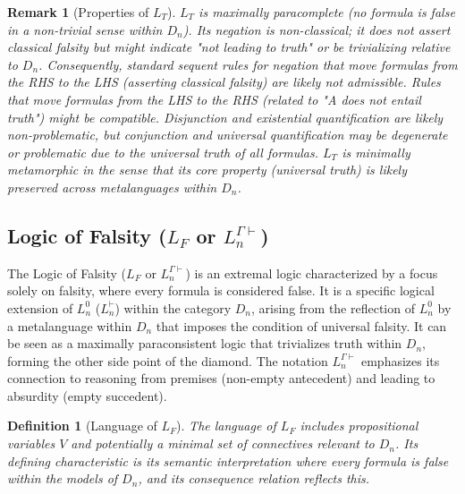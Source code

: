 \documentclass{article}
\newtheorem{definition}{Definition}[section] %
\newtheorem{remark}{Remark}[section] %
\newcommand{\LT}{L_T} %
\newcommand{\LF}{L_F} %
\begin{document}
																																											\begin{remark}[Properties of $\LT$]
																																												$\LT$ is maximally paracomplete (no formula is false in a non-trivial sense within $D_n$). Its negation is non-classical; it does not assert classical falsity but might indicate "not leading to truth" or be trivializing relative to $D_n$. Consequently, standard sequent rules for negation that move formulas from the RHS to the LHS (asserting classical falsity) are likely not admissible. Rules that move formulas from the LHS to the RHS (related to "A does not entail truth") might be compatible. Disjunction and existential quantification are likely non-problematic, but conjunction and universal quantification may be degenerate or problematic due to the universal truth of all formulas. $\LT$ is minimally metamorphic in the sense that its core property (universal truth) is likely preserved across metalanguages within $D_n$.
																																												\end{remark}
																																													
																																													\subsection{Logic of Falsity ($\LF$ or $L^{\Gamma\vdash}_n$)}
																																													
																																													The Logic of Falsity ($\LF$ or $L^{\Gamma\vdash}_n$) is an extremal logic characterized by a focus solely on falsity, where every formula is considered false. It is a specific logical extension of $L^0_n$ ($L^{\vdash}_n$) within the category $D_n$, arising from the reflection of $L^0_n$ by a metalanguage within $D_n$ that imposes the condition of universal falsity. It can be seen as a maximally paraconsistent logic that trivializes truth within $D_n$, forming the other side point of the diamond. The notation $L^{\Gamma\vdash}_n$ emphasizes its connection to reasoning from premises (non-empty antecedent) and leading to absurdity (empty succedent).
																																													
																																													\begin{definition}[Language of $\LF$]
																																														The language of $\LF$ includes propositional variables $V$ and potentially a minimal set of connectives relevant to $D_n$. Its defining characteristic is its semantic interpretation where every formula is false within the models of $D_n$, and its consequence relation reflects this.
																																														\end{definition}
																																															
\end{document}
